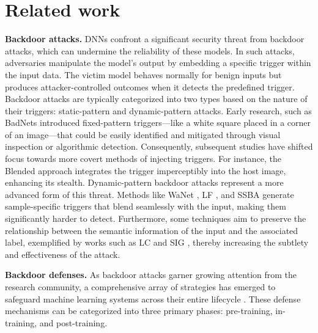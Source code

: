 \section{Related work}
\textbf{Backdoor attacks.}
DNNs confront a significant security threat from backdoor attacks, which can undermine the reliability of these models. In such attacks, adversaries manipulate the model's output by embedding a specific trigger within the input data. The victim model behaves normally for benign inputs but produces attacker-controlled outcomes when it detects the predefined trigger. Backdoor attacks are typically categorized into two types based on the nature of their triggers: static-pattern and dynamic-pattern attacks. Early research, such as BadNets \citep{gu2019badnets} introduced fixed-pattern triggers—like a white square placed in a corner of an image—that could be easily identified and mitigated through visual inspection or algorithmic detection.  Consequently, subsequent studies have shifted focus towards more covert methods of injecting triggers. For instance, the Blended approach \citep{chen2017targeted}  integrates the trigger imperceptibly into the host image, enhancing its stealth. Dynamic-pattern backdoor attacks represent a more advanced form of this threat. Methods like  WaNet \citep{nguyen2021wanet}, LF \citep{zeng2021rethinking}, and SSBA \citep{li2021invisible} generate sample-specific triggers that blend seamlessly with the input, making them significantly harder to detect. Furthermore, some techniques aim to preserve the relationship between the semantic information of the input and the associated label, exemplified by works such as LC \citep{shafahi2018poison} and SIG \citep{barni2019new}, thereby increasing the subtlety and effectiveness of the attack. 


\textbf{Backdoor defenses.}
As backdoor attacks garner growing attention from the research community, a comprehensive array of strategies has emerged to safeguard machine learning systems across their entire lifecycle \cite{wu2023defenses}. These defense mechanisms can be categorized into three primary phases: pre-training, in-training, and post-training.

